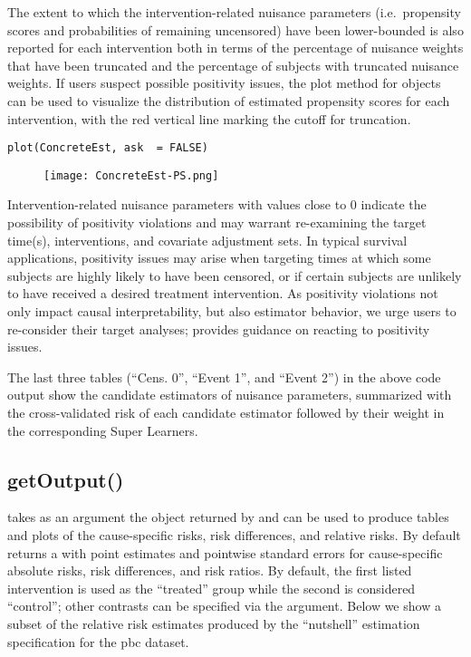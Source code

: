 The extent to which the intervention-related nuisance parameters (i.e.~propensity scores and probabilities of remaining uncensored) have been lower-bounded is also reported for each intervention both in terms of the percentage of nuisance weights that have been truncated and the percentage of subjects with truncated nuisance weights. If users suspect possible positivity issues, the plot method for  objects can be used to visualize the distribution of estimated propensity scores for each intervention, with the red vertical line marking the cutoff for truncation.

\begin{verbatim}
plot(ConcreteEst, ask  = FALSE)
\end{verbatim}

\begin{figure}[H]
\texttt{[image: ConcreteEst-PS.png]}
\caption{}
\label{fig:ps-diag}
\end{figure}

Intervention-related nuisance parameters with values close to 0 indicate the possibility of positivity violations and may warrant re-examining the target time(s), interventions, and covariate adjustment sets. In typical survival applications, positivity issues may arise when targeting times at which some subjects are highly likely to have been censored, or if certain subjects are unlikely to have received a desired treatment intervention. As positivity violations not only impact causal interpretability, but also estimator behavior, we urge users to re-consider their target analyses; \citep{petersen_diagnosing_2012} provides guidance on reacting to positivity issues.

The last three tables (``Cens. 0'', ``Event 1'', and ``Event 2'') in the above code output show the candidate estimators of nuisance parameters, summarized with the cross-validated risk of each candidate estimator followed by their weight in the corresponding Super Learners.

\hypertarget{sec-getoutput}{%
\subsection{getOutput()}\label{sec-getoutput}}

 takes as an argument the  object returned by  and can be used to produce tables and plots of the cause-specific risks, risk differences, and relative risks. By default  returns a  with point estimates and pointwise standard errors for cause-specific absolute risks, risk differences, and risk ratios. By default, the first listed intervention is used as the ``treated'' group while the second is considered ``control''; other contrasts can be specified via the  argument. Below we show a subset of the relative risk estimates produced by the ``nutshell'' estimation specification for the pbc dataset.

